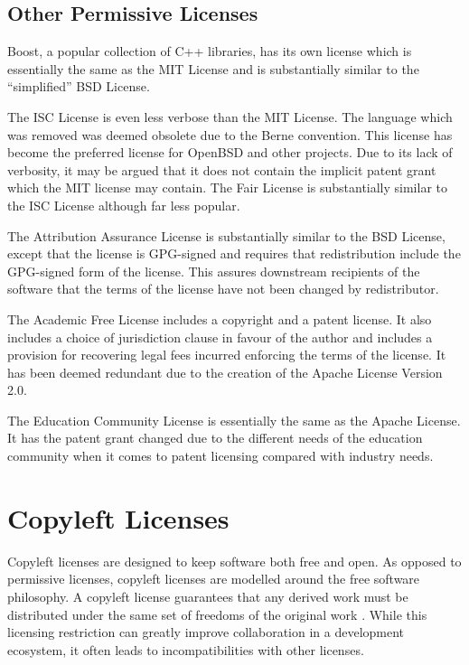 \documentclass[12pt,letterpaper]{article}
\begin{document}
\subsection{Other Permissive Licenses}

Boost, a popular collection of C++ libraries, has its own license which is essentially the same as the MIT License and is substantially similar to the ``simplified'' BSD License. \cite{boost}

The ISC License is even less verbose than the MIT License. The language which was removed was deemed obsolete due to the Berne convention. This license has become the preferred license for OpenBSD and other projects.\cite{openbsd} Due to its lack of verbosity, it may be argued that it does not contain the implicit patent grant which the MIT license may contain. The Fair License is substantially similar to the ISC License although far less popular.\cite{fair}

The Attribution Assurance License is substantially similar to the BSD License, except that the license is GPG-signed and requires that redistribution include the GPG-signed form of the license. This assures downstream recipients of the software that the terms of the license have not been changed by redistributor.\cite{attrassur}

The Academic Free License includes a copyright and a patent license. It also includes a choice of jurisdiction clause in favour of the author and includes a provision for recovering legal fees incurred enforcing the terms of the license. It has been deemed redundant due to the creation of the Apache License Version 2.0.\cite{academic}

The Education Community License is essentially the same as the Apache License. It has the patent grant changed due to the different needs of the education community when it comes to patent licensing compared with industry needs.\cite{education}

\newpage

\section{Copyleft Licenses}

Copyleft licenses are designed to keep software both free and open. As opposed to permissive licenses, copyleft licenses are modelled around the free software philosophy. A copyleft license guarantees that any derived work must be distributed under the same set of freedoms of the original work \cite{copyleft}. While this licensing restriction can greatly improve collaboration in a development ecosystem, it often leads to incompatibilities with other licenses.
\end{document}
